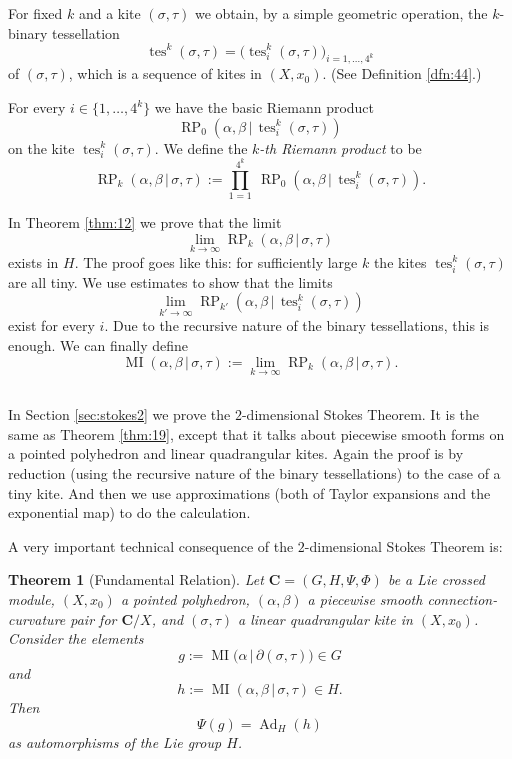\documentclass[10pt, a4paper]{amsart}
\newtheorem{thm}[equation]{Theorem}
\theoremstyle{definition}
\numberwithin{equation}{section}
\newcommand{\opn}{\operatorname}
\newcommand{\mbf}[1]{\mathbf{#1}}
\renewcommand{\vert}{\, | \,}
\newcommand{\lb}{\linebreak}
\begin{document}
For fixed $k$ and a kite $(\sigma, \tau)$ we obtain, by a simple geometric
operation, the $k$-binary tessellation 
\[ \opn{tes}^k (\sigma, \tau) = 
\bigl( \opn{tes}^k_i (\sigma, \tau) \bigr)_{i = 1, \ldots, 4^k} \]
of $(\sigma, \tau)$, which is a sequence of kites in $(X, x_0)$. 
(See Definition \ref{dfn:44}.)

For every $i \in \{ 1, \ldots, 4^k \}$ we have the basic Riemann product
\[ \opn{RP}_0(\alpha, \beta \vert \opn{tes}^k_i (\sigma, \tau)) \]
on the kite $\opn{tes}^k_i (\sigma, \tau)$. 
We define the {\em $k$-th Riemann product} to be 
\begin{equation} \label{eqn:170}
\opn{RP}_k(\alpha, \beta \vert \sigma, \tau) :=
\prod_{1 = 1}^{4^k}\ 
\opn{RP}_0(\alpha, \beta \vert \opn{tes}^k_i (\sigma, \tau)) .
\end{equation}

In Theorem \ref{thm:12} we prove that the limit
\[ \lim_{k \to \infty} \opn{RP}_k(\alpha, \beta \vert \sigma, \tau) \]
exists in $H$. The proof goes like this: for sufficiently large $k$ the 
kites $\opn{tes}^k_i (\sigma, \tau)$ are all tiny. We use estimates 
to show that the limits
\[ \lim_{k' \to \infty} \opn{RP}_{k'}(\alpha, \beta \vert 
\opn{tes}^k_i (\sigma, \tau) ) \]
exist for every $i$. Due to the recursive nature of the binary tessellations,
this is enough.  We can finally define
\begin{equation} 
\opn{MI}(\alpha, \beta \vert \sigma, \tau) := 
\lim_{k \to \infty} \opn{RP}_k(\alpha, \beta \vert \sigma, \tau) . 
\end{equation}


\subsection{}
In Section \ref{sec:stokes2} we prove the $2$-dimensional Stokes Theorem.
It is the same as Theorem \ref{thm:19}, except that it talks about 
piecewise smooth forms on a pointed polyhedron and linear quadrangular kites. 
Again the proof is by reduction (using the recursive nature of the binary
tessellations) to the case of a tiny kite. And then we use approximations 
(both of Taylor expansions and the exponential map) to do the
calculation. 

A very important technical consequence of the $2$-dimensional Stokes Theorem
is:

\begin{thm}[Fundamental Relation] \label{thm:21}
Let $\mbf{C} = (G, H, \Psi, \Phi)$
be a Lie crossed module, $(X, x_0)$ a pointed polyhedron, 
$(\alpha, \beta)$ a piecewise smooth \lb connection-curvature pair for 
$\mbf{C} / X$, and $(\sigma, \tau)$ a linear quadrangular kite in $(X, x_0)$.
Consider the elements
\[ g := \opn{MI} \bigl( \alpha \vert \partial (\sigma, \tau) \bigr) \in G \]
and
\[ h :=  \opn{MI} (\alpha, \beta \vert \sigma, \tau) \in H . \]
Then
\[ \Psi(g) = \opn{Ad}_H(h) \]
as automorphisms of the Lie group $H$. 
\end{thm}
\end{document}
